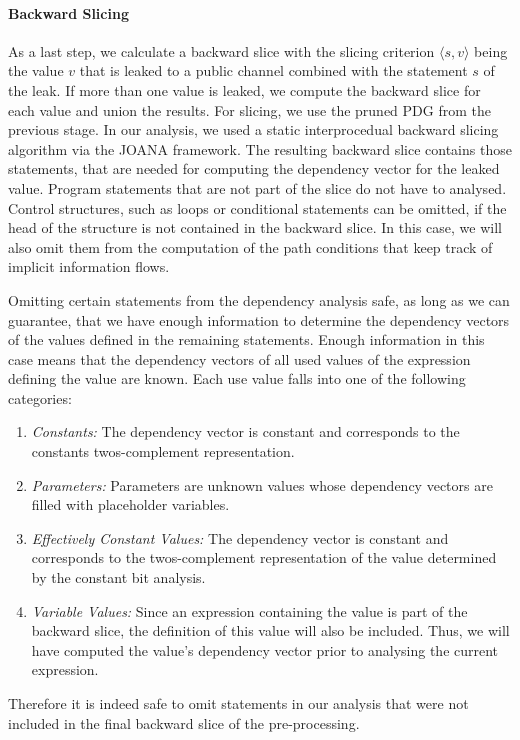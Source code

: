 \paragraph{Backward Slicing}
As a last step, we calculate a backward slice with the slicing criterion $\langle s, v \rangle$ being the value $v$ that is leaked to a public channel combined with the statement $s$ of the leak. If more than one value is leaked, we compute the backward slice for each value and union the results.  For slicing, we use the pruned PDG from the previous stage. In our analysis, we used a static interprocedual backward slicing algorithm via the JOANA framework. 
The resulting backward slice contains those statements, that are needed for computing the dependency vector for the leaked value. Program statements that are not part of the slice do not have to analysed. Control structures, such as loops or conditional statements can be omitted, if the head of the structure is not contained in the backward slice. In this case, we will also omit them from the computation of the path conditions that keep track of implicit information flows.

Omitting certain statements from the dependency analysis safe, as long as we can guarantee, that we have enough information to determine the dependency vectors of the values defined in the remaining statements. Enough information in this case means that the dependency vectors of all used values of the expression defining the value are known. Each use value falls into one of the following categories:
\begin{enumerate}
    \item \emph{Constants: }The dependency vector is constant and corresponds to the constants twos-complement representation.
    \item \emph{Parameters: }Parameters are unknown values whose dependency vectors are filled with placeholder variables.
    \item \emph{Effectively Constant Values: }The dependency vector is constant and corresponds to the twos-complement representation of the value determined by the constant bit analysis.
    \item \emph{Variable Values: }Since an expression containing the value is part of the backward slice, the definition of this value will also be included. Thus, we will have computed the value's dependency vector prior to analysing the current expression.
\end{enumerate}
Therefore it is indeed safe to omit statements in our analysis that were not included in the final backward slice of the pre-processing.

